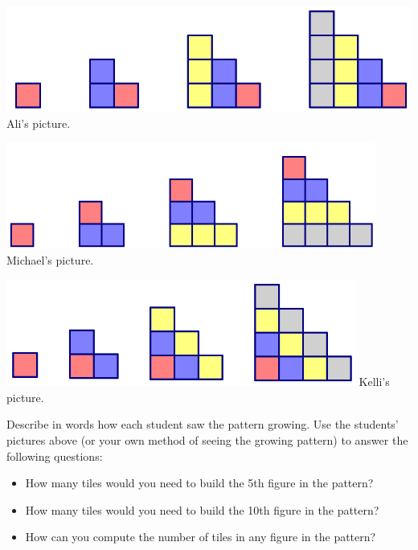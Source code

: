 \begin{center}
\includegraphics[height=3.5cm]{growth1}
Ali's picture.

\includegraphics[height=3.5cm]{growth2}
Michael's picture.

\includegraphics[height=3.5cm]{growth3}
Kelli's picture.

\end{center}


\bigskip


\begin{thinkpair*}
Describe in words how each student saw the pattern growing.
Use the students' pictures above (or your own method of seeing the growing pattern) to answer the following questions:
\begin{itemize}
\item
How many tiles would you need to build the 5th figure in the pattern?\\

\item
How many tiles would you need to build the 10th figure in the pattern?\\


\item
How can you compute the number of tiles in any figure in the pattern?
\end{itemize}

\end{thinkpair*}

